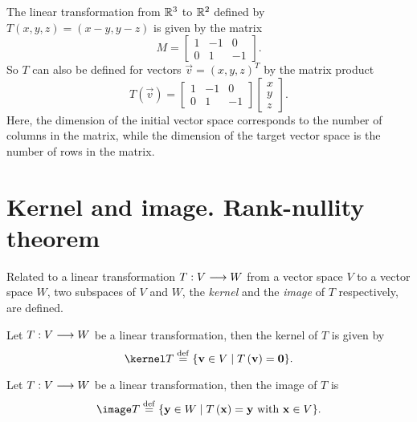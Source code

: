\begin{example}
    The linear transformation from $\mathbb{R}^3$ to $\mathbb{R}^2$ defined by $T\left( x, y, z \right) = \left( x - y,
    y - z\right) $ is given by the matrix
    \begin{equation}
        M = \begin{bmatrix}
            1 & -1 & 0 \\
            0 & 1 & -1
        \end{bmatrix} .
    \end{equation}
    So $T$ can also be defined for vectors $\vec{v} = \left( x, y, z \right)^T $ by the matrix product
    \begin{equation}
        T\left( \vec{v} \right) = \begin{bmatrix}
            1 & -1 & 0 \\
            0 & 1 & -1
        \end{bmatrix}\begin{bmatrix}
            x \\ y \\ z
        \end{bmatrix}.
    \end{equation}
    Here, the dimension of the initial vector space corresponds to the number of columns in the matrix, while
    the dimension of the target vector space is the number of rows in the matrix.
\end{example}



\section{Kernel and image. Rank-nullity theorem}
Related to a linear transformation $T : V\longrightarrow W$ from a vector space $V$ to a vector space $W$, two
subspaces of $V$ and $W$, the \textit{kernel} and the \textit{image} of $T$ respectively, are defined.

\begin{defi}[Kernel]
    Let $T : V\longrightarrow W$ be a linear transformation, then the kernel of $T$ is given by
    \begin{equation}
        \kernel T\bydef \{\vec{v}\in V\st T\left( \vec{v} \right) = \vec{0}\}.
    \end{equation}
\end{defi}

\begin{defi}[Image]
    Let $T : V\longrightarrow W$ be a linear transformation, then the image of $T$ is
    \begin{equation}
        \image T\bydef \{\vec{y}\in W\st T\left( \vec{x} \right) = \vec{y} \textrm{ with } \vec{x}\in V\}.
    \end{equation}
\end{defi}

